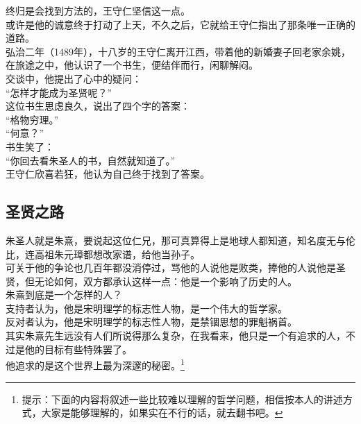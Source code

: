 \begin{multicols}{\theparacolNo}
终归是会找到方法的，王守仁坚信这一点。\\

或许是他的诚意终于打动了上天，不久之后，它就给王守仁指出了那条唯一正确的道路。\\

弘治二年（1489年），十八岁的王守仁离开江西，带着他的新婚妻子回老家余姚，在旅途之中，他认识了一个书生，便结伴而行，闲聊解闷。\\

交谈中，他提出了心中的疑问：\\

“怎样才能成为圣贤呢？”\\

这位书生思虑良久，说出了四个字的答案：\\

“格物穷理。”\\

“何意？”\\

书生笑了：\\

“你回去看朱圣人的书，自然就知道了。”\\

王守仁欣喜若狂，他认为自己终于找到了答案。\\

\subsection{圣贤之路}
朱圣人就是朱熹，要说起这位仁兄，那可真算得上是地球人都知道，知名度无与伦比，连高祖朱元璋都想改家谱，给他当孙子。\\

可关于他的争论也几百年都没消停过，骂他的人说他是败类，捧他的人说他是圣贤，但无论如何，双方都承认这样一点：他是一个影响了历史的人。\\

朱熹到底是一个怎样的人？\\

支持者认为，他是宋明理学的标志性人物，是一个伟大的哲学家。\\

反对者认为，他是宋明理学的标志性人物，是禁锢思想的罪魁祸首。\\

其实朱熹先生远没有人们所说得那么复杂，在我看来，他只是一个有追求的人，不过是他的目标有些特殊罢了。\\

他追求的是这个世界上最为深邃的秘密。\footnote{提示：下面的内容将叙述一些比较难以理解的哲学问题，相信按本人的讲述方式，大家是能够理解的，如果实在不行的话，就去翻书吧。}\\


\end{multicols}
